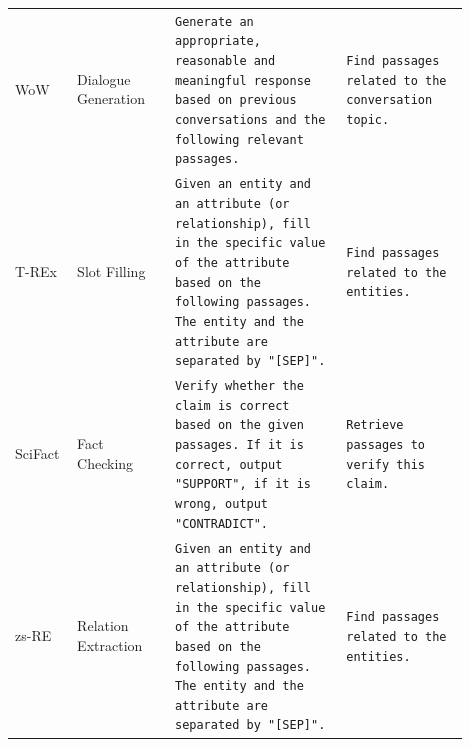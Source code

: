 \documentclass[11pt]{article}
\begin{document}
\begin{table}[p]
\begin{tabular}{p{0.1\linewidth}  p{0.2\linewidth}  p{0.35\linewidth}  p{0.25\linewidth}}
\hline


\multirow{5}{*}{WoW} & \multirow{5}{*}{Dialogue Generation} & \multirow{5}{\linewidth}{\texttt{Generate an appropriate, reasonable and meaningful response based on previous conversations and the following relevant passages.}} & \multirow{5}{\linewidth}{\texttt{Find passages related to the conversation topic.}} \\
& & & \\
& & & \\
& & & \\
& & & \\



\hline


\multirow{7}{*}{T-REx} & \multirow{7}{*}{Slot Filling} & \multirow{7}{\linewidth}{\texttt{Given an entity and an attribute (or relationship), fill in the specific value of the attribute based on the following passages. The entity and the attribute are separated by "[SEP]".}} & \multirow{7}{\linewidth}{\texttt{Find passages related to the entities.}} \\
& & & \\
& & & \\
& & & \\
& & & \\
& & & \\
& & & \\


\hline


\multirow{5}{*}{SciFact} & \multirow{5}{*}{Fact Checking} & \multirow{5}{\linewidth}{\texttt{Verify whether the claim is correct based on the given passages. If it is correct, output "SUPPORT", if it is wrong, output "CONTRADICT".}} & \multirow{5}{\linewidth}{\texttt{Retrieve passages to verify this claim.}} \\
& & & \\
& & & \\
& & & \\
& & & \\



\hline


\multirow{7}{*}{zs-RE} & \multirow{7}{*}{Relation Extraction} & \multirow{7}{\linewidth}{\texttt{Given an entity and an attribute (or relationship), fill in the specific value of the attribute based on the following passages. The entity and the attribute are separated by "[SEP]".}} & \multirow{7}{\linewidth}{\texttt{Find passages related to the entities.}} \\
& & & \\
& & & \\
& & & \\
& & & \\
& & & \\
& & & \\



\end{tabular}
\end{table}
\end{document}
